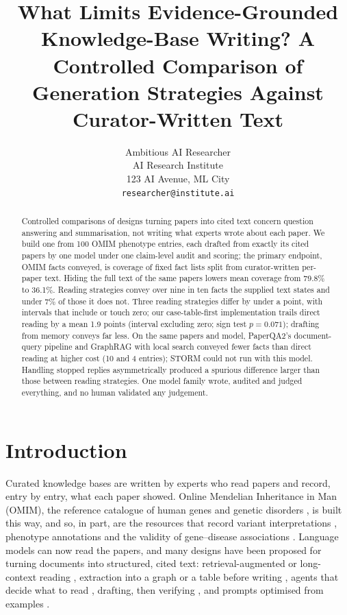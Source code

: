 \documentclass{article} %
\title{What Limits Evidence-Grounded Knowledge-Base Writing? A Controlled Comparison of Generation Strategies Against Curator-Written Text}
\author{Ambitious AI Researcher\\
AI Research Institute\\
123 AI Avenue, ML City\\
\texttt{researcher@institute.ai}
}
\begin{document}
\maketitle


\begin{abstract}
Controlled comparisons of designs turning papers into cited text concern question answering and summarisation, not writing what experts wrote about each paper. We build one from 100 OMIM phenotype entries, each drafted from exactly its cited papers by one model under one claim-level audit and scoring; the primary endpoint, OMIM facts conveyed, is coverage of fixed fact lists split from curator-written per-paper text. Hiding the full text of the same papers lowers mean coverage from 79.8\% to 36.1\%. Reading strategies convey over nine in ten facts the supplied text states and under 7\% of those it does not. Three reading strategies differ by under a point, with intervals that include or touch zero; our case-table-first implementation trails direct reading by a mean 1.9 points (interval excluding zero; sign test $p=0.071$); drafting from memory conveys far less. On the same papers and model, PaperQA2's document-query pipeline and GraphRAG with local search conveyed fewer facts than direct reading at higher cost (10 and 4 entries); STORM could not run with this model. Handling stopped replies asymmetrically produced a spurious difference larger than those between reading strategies. One model family wrote, audited and judged everything, and no human validated any judgement.
\end{abstract}

\section{Introduction}
\label{sec:intro}
Curated knowledge bases are written by experts who read papers and record, entry by entry, what each paper showed. Online Mendelian Inheritance in Man (OMIM), the reference catalogue of human genes and genetic disorders \citep{Amberger2014OmimorgOnline,amberger2019omim,hamosh2021online}, is built this way, and so, in part, are the resources that record variant interpretations \citep{Landrum2017ClinvarImproving,landrum2025clinvar}, phenotype annotations \citep{robinson2008human,gargano2024human} and the validity of gene--disease associations \citep{strande2017evaluating}. Language models can now read the papers, and many designs have been proposed for turning documents into structured, cited text: retrieval-augmented or long-context reading \citep{Lewis2020RetrievalaugmentedGeneration,li2024retrieval}, extraction into a graph or a table before writing \citep{edge2024local,joshi2026sliders}, agents that decide what to read \citep{Nakano2021WebgptBrowserassisted,Lla2023PaperqaRetrievalaugmented,skarlinski2024language}, drafting, then verifying \citep{Gao2022RarrResearching,dhuliawala2024chainofverification}, and prompts optimised from examples \citep{Khattab2023DspyCompiling,agrawal2026gepa}.
\end{document}

